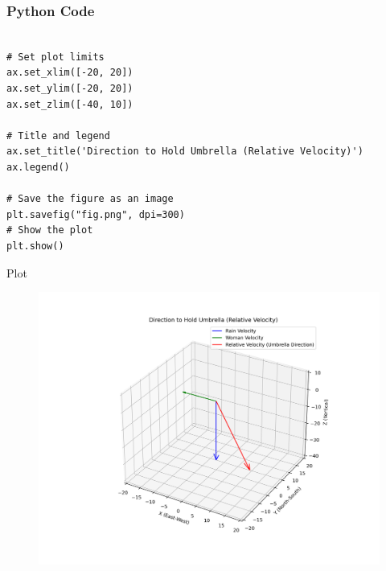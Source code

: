 \documentclass{beamer}
\begin{document}
\begin{frame}[fragile]
    \frametitle{Python Code}
    \begin{lstlisting}

# Set plot limits
ax.set_xlim([-20, 20])
ax.set_ylim([-20, 20])
ax.set_zlim([-40, 10])

# Title and legend
ax.set_title('Direction to Hold Umbrella (Relative Velocity)')
ax.legend()

# Save the figure as an image
plt.savefig("fig.png", dpi=300)
# Show the plot
plt.show()

    \end{lstlisting}
\end{frame}




  
\begin{frame}{Plot}
\begin{figure}
    \centering
    \includegraphics[width=0.8\columnwidth]{figs/fig.png}
    \caption{}
    \label{fig:figs/fig.png}
\end{figure}
\end{frame}
\end{document}
